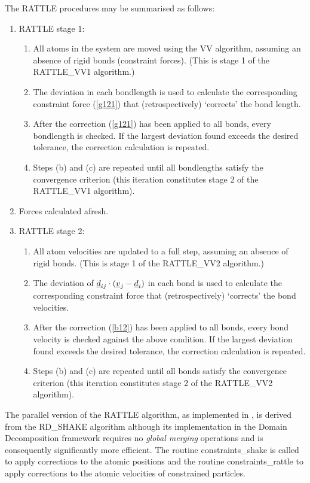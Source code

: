 The RATTLE procedures may be summarised as follows:
\begin{enumerate}
\item RATTLE stage 1:
\begin{enumerate}
\item All atoms in the system are moved using the
VV algorithm, assuming an absence of
rigid bonds (constraint forces).  (This is
stage 1 of the RATTLE\_VV1 algorithm.)
\item The deviation in each bondlength is used to calculate the
corresponding constraint force (\ref{g121}) that (retrospectively)
`corrects' the bond length.
\item After the correction (\ref{g121}) has been applied to all
bonds, every bondlength is checked.  If the largest deviation found
exceeds the desired tolerance, the correction calculation is
repeated.
\item Steps (b) and (c) are repeated until all
bondlengths satisfy the convergence criterion (this iteration
constitutes stage 2 of the RATTLE\_VV1 algorithm).
\end{enumerate}
\item Forces calculated afresh.
\item RATTLE stage 2:
\begin{enumerate}
\item All atom velocities are updated to a full step, assuming an
absence of rigid bonds.  (This is stage 1
of the RATTLE\_VV2 algorithm.)
\item The deviation of $\mbox{$\underline{d}$}_{ij} \cdot (\mbox{$\underline{v}$}_{j}-\mbox{$\underline{d}$}_{i})$
in each bond is used to calculate the corresponding constraint
force that (retrospectively) `corrects' the bond velocities.
\item After the correction (\ref{b12}) has been applied to all bonds,
every bond velocity is checked against the above condition.  If the
largest deviation found exceeds the desired tolerance, the correction
calculation is repeated.
\item Steps (b) and (c) are repeated until all bonds satisfy the
convergence criterion (this iteration constitutes stage 2 of the
RATTLE\_VV2 algorithm).
\end{enumerate}
\end{enumerate}

The parallel version of the RATTLE algorithm, as implemented in
\D, is derived from the RD\_SHAKE
algorithm \cite{smith-94b} although its implementation in the
Domain Decomposition framework requires no {\em global merging}
operations and is consequently significantly more efficient.  The
routine {\sc constraints\_shake} is called to apply corrections to
the atomic positions and the routine {\sc constraints\_rattle} to
apply corrections to the atomic velocities of constrained particles.


